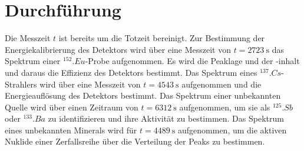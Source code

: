 \section{Durchführung}
\label{sec:Durchführung}
Die Messzeit $t$ ist bereits um die Totzeit bereinigt.
Zur Bestimmung der Energiekalibrierung des Detektors wird über eine Messzeit von $t=\SI{2723}{\second}$ das Spektrum einer $^{152}.{Eu}$-Probe aufgenommen.
Es wird die Peaklage und der -inhalt und daraus die Effizienz des Detektors bestimmt.
Das Spektrum eines $^{137}.{Cs}$-Strahlers wird über eine Messzeit von $t=\SI{4543}{\second}$ aufgenommen und die Energieauflösung des Detektors bestimmt.
Das Spektrum einer unbekannten Quelle wird über einen Zeitraum von $t=\SI{6312}{\second}$ aufgenommen, um sie  als $^{125}.{Sb}$ oder $^{133}.{Ba}$ zu identifizieren und ihre Aktivität zu bestimmen.
Das Spektrum eines unbekannten Minerals wird für $t=\SI{4489}{\second} $ aufgenommen, um die aktiven Nuklide einer Zerfallsreihe über die Verteilung der Peaks zu bestimmen.